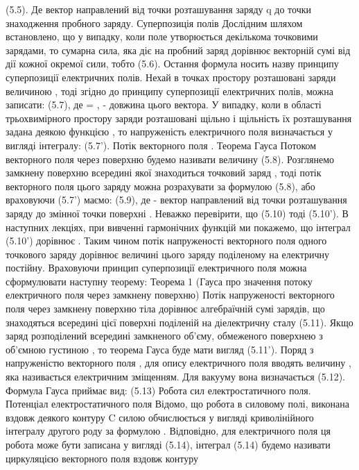  									(5.5).
Де вектор   направлений від точки розташування заряду q до точки знаходження пробного заряду. 
Суперпозиція полів
Дослідним шляхом встановлено, що у випадку, коли поле утворюється декількома точковими зарядами, то сумарна сила, яка діє на пробний заряд дорівнює векторній сумі від дії кожної окремої сили, тобто  
 									(5.6).
Остання формула носить назву принципу суперпозиції електричних полів.
Нехай в точках   простору розташовані заряди величиною    , тоді згідно до принципу суперпозиції електричних полів, можна записати:
 								(5.7),
де   = ,   - довжина цього вектора. 
У випадку, коли в області   трьохвимірного простору заряди розташовані щільно і щільність їх розташування задана деякою функцією  , то напруженість електричного поля визначається у вигляді інтегралу:
  							(5.7').
Потік векторного поля . Теорема Гауса
Потоком векторного поля   через поверхню   будемо називати величину 
 									(5.8).
Розглянемо замкнену поверхню   всередині якої знаходиться точковий заряд  , тоді потік векторного поля цього заряду можна розрахувати за формулою (5.8), або враховуючи (5.7') маємо:
 								(5.9), 		де   - вектор направлений від точки розташування заряду до змінної точки поверхні  .
Неважко перевірити, що  					(5.10) 
тоді  		  			(5.10').
В наступних лекціях, при вивченні гармонічних функцій ми покажемо, що інтеграл (5.10') дорівнює  .
Таким чином потік напруженості векторного поля одного точкового заряду дорівнює величині цього заряду поділеному на електричну постійну.
Враховуючи принцип суперпозиції електричного поля можна сформулювати наступну теорему:
Теорема 1 (Гауса про значення потоку електричного поля через замкнену поверхню) Потік напруженості векторного поля через замкнену поверхню   тіла дорівнює алгебраїчній сумі зарядів, що знаходяться всередині цієї поверхні поділеній на діелектричну сталу   	
 										(5.11).
Якщо заряд розподілений всередині замкненого об'єму, обмеженого поверхнею   з об'ємною густиною   , то теорема Гауса буде мати вигляд  									(5.11').
Поряд з напруженістю векторного поля  , для опису електричного поля вводять величину  , яка називається електричним зміщенням. Для вакууму вона визначається   									(5.12).
Формула Гауса приймає вид:  	 				(5.13)
Робота сил електростатичного поля. Потенціал електростатичного поля
Відомо, що робота в силовому полі, виконана вздовж деякого контуру C силою   обчислюється у вигляді  криволінійного інтегралу другого роду за формулою 
 . Відповідно, для електричного поля ця робота може бути записана у вигляді   							(5.14), 
інтеграл (5.14) будемо називати циркуляцією векторного поля вздовж контуру  
